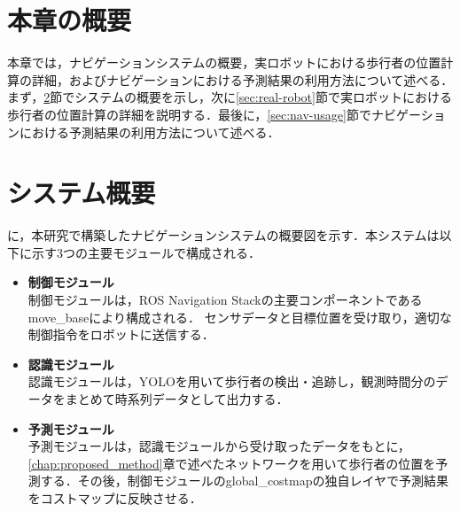 

\section{本章の概要}

本章では，ナビゲーションシステムの概要，実ロボットにおける歩行者の位置計算の詳細，およびナビゲーションにおける予測結果の利用方法について述べる．まず，\ref{sec:nav-sys}節でシステムの概要を示し，次に\ref{sec:real-robot}節で実ロボットにおける歩行者の位置計算の詳細を説明する．最後に，\ref{sec:nav-usage}節でナビゲーションにおける予測結果の利用方法について述べる．


\section{システム概要}\label{sec:nav-sys}
に，本研究で構築したナビゲーションシステムの概要図を示す．本システムは以下に示す3つの主要モジュールで構成される．

\begin{itemize}
  \item \textbf{制御モジュール} \\
  制御モジュールは，ROS Navigation Stackの主要コンポーネントであるmove\_baseにより構成される．
  センサデータと目標位置を受け取り，適切な制御指令をロボットに送信する．
  \item \textbf{認識モジュール} \\
  認識モジュールは，YOLOを用いて歩行者の検出・追跡し，観測時間分のデータをまとめて時系列データとして出力する．
  \item \textbf{予測モジュール} \\
  予測モジュールは，認識モジュールから受け取ったデータをもとに，\ref{chap:proposed_method}章で述べたネットワークを用いて歩行者の位置を予測する．その後，制御モジュールのglobal\_costmapの独自レイヤで予測結果をコストマップに反映させる．
\end{itemize}



\vspace{-10pt}

